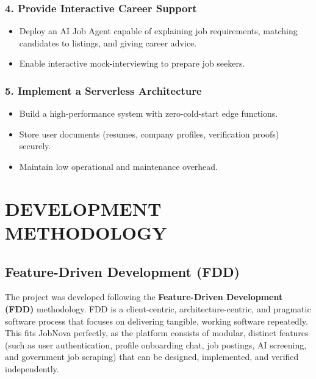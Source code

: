 \documentclass[12pt,a4paper]{report}
\begin{document}
\subsection{4. Provide Interactive Career Support}
\begin{itemize}
    \item Deploy an AI Job Agent capable of explaining job requirements, matching candidates to listings, and giving career advice.
    \item Enable interactive mock-interviewing to prepare job seekers.
\end{itemize}

\subsection{5. Implement a Serverless Architecture}
\begin{itemize}
    \item Build a high-performance system with zero-cold-start edge functions.
    \item Store user documents (resumes, company profiles, verification proofs) securely.
    \item Maintain low operational and maintenance overhead.
\end{itemize}


\chapter{DEVELOPMENT METHODOLOGY}

\section{Feature-Driven Development (FDD)}

The project was developed following the \textbf{Feature-Driven Development (FDD)} methodology. FDD is a client-centric, architecture-centric, and pragmatic software process that focuses on delivering tangible, working software repeatedly. This fits JobNova perfectly, as the platform consists of modular, distinct features (such as user authentication, profile onboarding chat, job postings, AI screening, and government job scraping) that can be designed, implemented, and verified independently.
\end{document}

